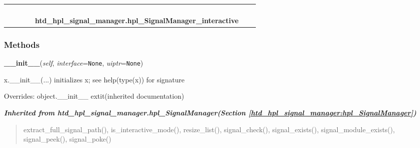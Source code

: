     \label{htd_hpl_signal_manager:hpl_SignalManager_interactive}
\begin{tabular}{cccccccc}
\multicolumn{2}{r}{\settowidth{\BCL}{object}\multirow{2}{\BCL}{object}}
&&
&&
  \\\cline{3-3}
  &&\multicolumn{1}{c|}{}
&&
&&
  \\
\multicolumn{4}{r}{\settowidth{\BCL}{htd\_hpl\_signal\_manager.hpl\_SignalManager}\multirow{2}{\BCL}{htd\_hpl\_signal\_manager.hpl\_SignalManager}}
&&
  \\\cline{5-5}
  &&&&\multicolumn{1}{c|}{}
&&
  \\
&&&&\multicolumn{2}{l}{\textbf{htd\_hpl\_signal\_manager.hpl\_SignalManager\_interactive}}
\end{tabular}



  \subsubsection{Methods}

    \vspace{0.5ex}

\hspace{.8\funcindent}\begin{boxedminipage}{\funcwidth}

    \raggedright \textbf{\_\_init\_\_}(\textit{self}, \textit{interface}={\tt None}, \textit{uiptr}={\tt None})

\setlength{\parskip}{2ex}
    x.\_\_init\_\_(...) initializes x; see help(type(x)) for signature

\setlength{\parskip}{1ex}
      Overrides: object.\_\_init\_\_ 	extit{(inherited documentation)}

    \end{boxedminipage}


\large{\textbf{\textit{Inherited from htd\_hpl\_signal\_manager.hpl\_SignalManager\textit{(Section \ref{htd_hpl_signal_manager:hpl_SignalManager})}}}}

\begin{quote}
extract\_full\_signal\_path(), is\_interactive\_mode(), resize\_list(), signal\_check(), signal\_exists(), signal\_module\_exists(), signal\_peek(), signal\_poke()
\end{quote}

